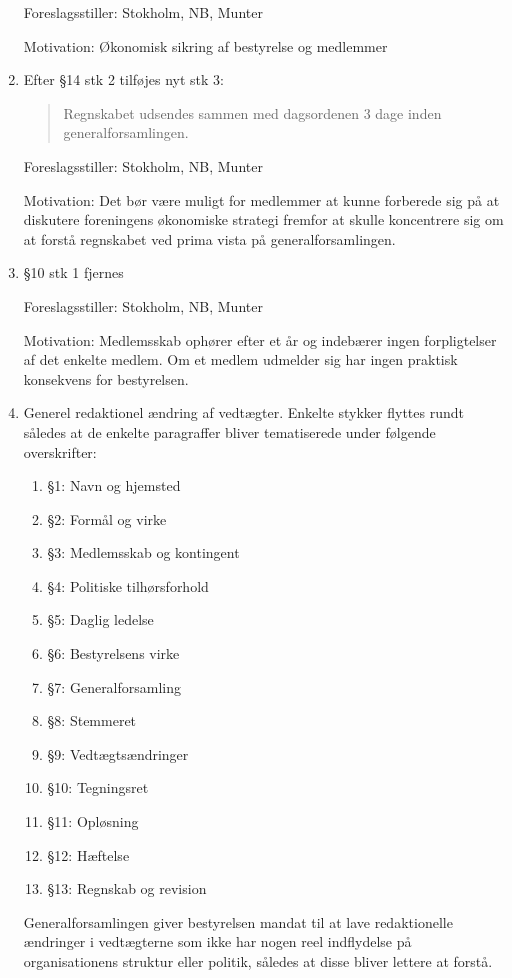 \documentclass[a4paper,12pt,danish]{article}
\begin{document}
\begin{enumerate}
Foreslagsstiller: Stokholm, NB, Munter

Motivation: Økonomisk sikring af bestyrelse og medlemmer

\item Efter \S14 stk 2 tilføjes nyt stk 3:
\begin{quote}
Regnskabet udsendes sammen med dagsordenen 3 dage inden generalforsamlingen.
\end{quote}

Foreslagsstiller: Stokholm, NB, Munter

Motivation: Det bør være muligt for medlemmer at kunne forberede sig på at diskutere foreningens økonomiske strategi fremfor at skulle koncentrere sig om at forstå regnskabet ved prima vista på generalforsamlingen.

\item \S10 stk 1 fjernes

Foreslagsstiller: Stokholm, NB, Munter

Motivation: Medlemsskab ophører efter et år og indebærer ingen forpligtelser af det enkelte medlem. Om et medlem udmelder sig har ingen praktisk konsekvens for bestyrelsen.

\item Generel redaktionel ændring af vedtægter. Enkelte stykker flyttes rundt således at de enkelte paragraffer bliver tematiserede under følgende overskrifter:
\begin{enumerate}
\item \S1: Navn og hjemsted
\item \S2: Formål og virke
\item \S3: Medlemsskab og kontingent
\item \S4: Politiske tilhørsforhold
\item \S5: Daglig ledelse
\item \S6: Bestyrelsens virke
\item \S7: Generalforsamling
\item \S8: Stemmeret
\item \S9: Vedtægtsændringer
\item \S10: Tegningsret
\item \S11: Opløsning
\item \S12: Hæftelse
\item \S13: Regnskab og revision
\end{enumerate}

Generalforsamlingen giver bestyrelsen mandat til at lave redaktionelle ændringer i vedtægterne som ikke har nogen reel indflydelse på organisationens struktur eller politik, således at disse bliver lettere at forstå.


\end{enumerate}
\end{document}
